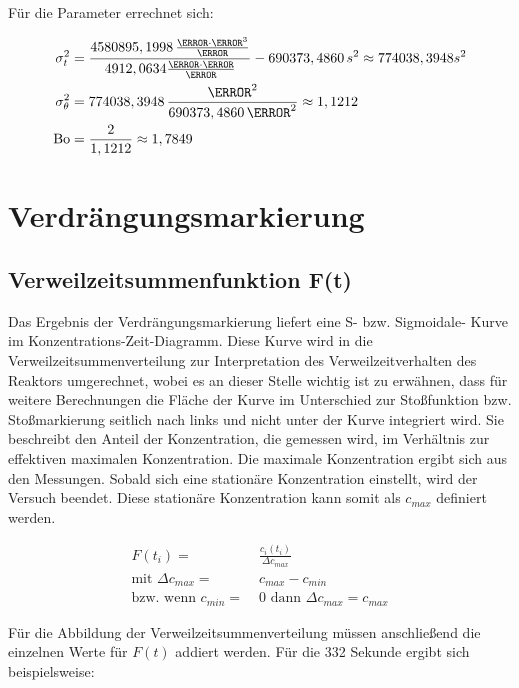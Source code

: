 \documentclass[12pt,liststotoc]{report}
\begin{document}
Für die Parameter errechnet sich:

\begin{align*}
\sigma^{2}_t =&\;\frac{ 4580895,1998\,\frac{\mole \cdot \s^3}{\litre}}{ 4912,0634\frac{\mole \cdot \s}{\litre}} - 690373,4860
\,s^2\approx 774038,3948
s^2\\
\sigma_\theta^2 =&\; 774038,3948\,\frac{\s^2}{690373,4860\,\s^2}\approx 1,1212\\
\text{Bo} =&\; \frac{2}{1,1212}\approx 1,7849
\end{align*}


\section{Verdrängungsmarkierung}


\subsection{Verweilzeitsummenfunktion F(t)}

Das Ergebnis der Verdrängungsmarkierung liefert eine S- bzw. Sigmoidale- Kurve im Konzentrations-Zeit-Diagramm. Diese Kurve wird in die Verweilzeitsummenverteilung zur Interpretation des Verweilzeitverhalten des Reaktors umgerechnet, wobei es an dieser Stelle wichtig ist zu erwähnen, dass für weitere Berechnungen die Fläche der Kurve im Unterschied zur Stoßfunktion bzw. Stoßmarkierung seitlich nach links und nicht unter der Kurve integriert wird. Sie beschreibt den Anteil der Konzentration, die gemessen wird, im Verhältnis zur effektiven maximalen Konzentration. Die maximale Konzentration ergibt sich aus den Messungen. Sobald sich eine stationäre Konzentration einstellt, wird der Versuch beendet. Diese stationäre Konzentration kann somit als $c_{max}$ definiert werden. 

\begin{align}
F(t_i)=&\;\frac{c_i(t_i)}{\Delta c_{max}}\\
\text{mit } \Delta c_{max} =&\; c_{max} - c_{min}\\
\text{bzw. wenn } c_{min} =&\; 0 \text{ dann } \Delta c_{max} = c_{max} 
\end{align}

Für die Abbildung der Verweilzeitsummenverteilung müssen anschließend die einzelnen Werte für $F(t)$ addiert werden. Für die 332 Sekunde ergibt sich beispielsweise:
\end{document}
